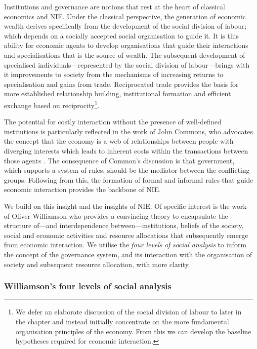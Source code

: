 Institutions and governance are notions that rest at the heart of classical economics and NIE. Under the classical perspective, the generation of economic wealth derives specifically from the development of the social division of labour; which depends on a socially accepted social organisation to guide it. It is this ability for economic agents to develop organisations that guide their interactions and specialisations that is the source of wealth. The subsequent development of specialised individuals---represented by the social division of labour---brings with it improvements to society from the mechanisms of increasing returns to specialisation and gains from trade. Reciprocated trade provides the basis for more established relationship building, institutional formation and efficient exchange based on reciprocity\footnote{We defer an elaborate discussion of the social division of labour to later in the chapter and instead initially concentrate on the more fundamental organisation principles of the economy. From this we can develop the baseline hypotheses required for economic interaction.}.

The potential for costly interaction without the presence of well-defined institutions is particularly reflected in the work of John Commons, who advocates the concept that the economy is a web of relationships between people with diverging interests which leads to inherent costs within the transactions between those agents \citep{Commons1931, Commons1934}. The consequence of Common's discussion is that government, which supports a system of rules, should be the mediator between the conflicting groups. Following from this, the formation of formal and informal rules that guide economic interaction provides the backbone of NIE. 

We build on this insight and the insights of NIE. Of specific interest is the work of Oliver Williamson who provides a convincing theory to encapsulate the structure of---and interdependence between---institutions, beliefs of the society, social and economic activities and resource allocations that subsequently emerge from economic interaction. We utilise the \emph{four levels of social analysis} \citep{Williamson2000} to inform the concept of the governance system, and its interaction with the organisation of society and subsequent resource allocation, with more clarity.

\subsubsection{Williamson's four levels of social analysis}

